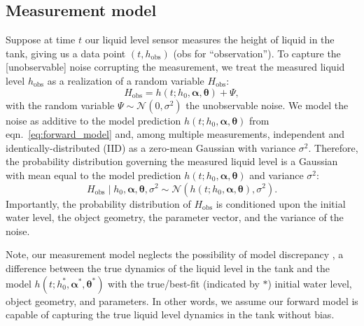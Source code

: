 \documentclass[openacc]{rsproca_new}%
\newcommand\themodel {$h(t; h_0, \boldsymbol \alpha, \boldsymbol\theta)$\xspace}
\newcommand\themodelnomath {h(t; h_0, \boldsymbol \alpha, \boldsymbol\theta)}
\begin{document}
\subsection{Measurement model}
Suppose at time $t$ our liquid level sensor measures the height of liquid in the tank, giving us a data point $(t, h_{\text{obs}})$ (obs for ``observation''). 
To capture the [unobservable] noise corrupting the measurement, we treat the measured liquid level $h_{\text{obs}}$ as a realization of a random variable $H_{\text{obs}}$:
\begin{equation}
	H_{\text{obs}} = \themodelnomath + \Psi,
\end{equation}
with the random variable $\Psi \sim \mathcal{N}(0, \sigma^2)$ the unobservable noise. 
We model the noise as additive to the model prediction \themodel from eqn.~\ref{eq:forward_model} and, among multiple measurements, independent and identically-distributed (IID) as a zero-mean Gaussian with variance $\sigma^2$. 
Therefore, the probability distribution governing the measured liquid level is a Gaussian with mean equal to the model prediction \themodel and variance $\sigma^2$:
\begin{equation}
	H_{\text{obs}} \mid h_0, \boldsymbol \alpha, \boldsymbol  \theta, \sigma^2 \sim \mathcal{N}(\themodelnomath, \sigma^2). \label{eq:H_obs_distn}
\end{equation} Importantly, the probability distribution of $H_{\text{obs}}$ is conditioned upon the initial water level, the object geometry, the parameter vector, and the variance of the noise.


Note, our measurement model neglects the possibility of model discrepancy \cite{brynjarsdottir2014learning,kennedy2001bayesian}, a difference between the true dynamics of the liquid level in the tank and the model $h(t; h_0^*,  \boldsymbol \alpha^*, \boldsymbol \theta^*)$ with the true/best-fit (indicated by $*$) initial water level, object geometry, and parameters. In other words, we assume our forward model is capable of capturing the true liquid level dynamics in the tank without bias.
\end{document}
